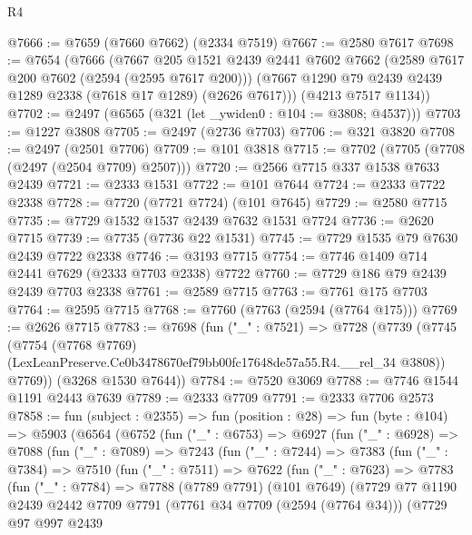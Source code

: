 \begin{lexlean}{R4}
\begin{coremodule}
@7666 := @7659 (@7660 @7662) (@2334 @7519)
@7667 := @2580 @7617
@7698 := @7654
    (@7666
      (@7667
        @205
        @1521
        @2439
        @2441
        @7602
        @7662
        (@2589 @7617 @200 @7602 (@2594 (@2595 @7617 @200)))
        (@7667 @1290 @79 @2439 @2439 @1289 @2338 (@7618 @17 @1289) (@2626 @7617)))
      (@4213 @7517 @1134))
@7702 := @2497 (@6565 (@321 (let _ywiden0 : @104 := @3808; @4537)))
@7703 := @1227 @3808
@7705 := @2497 (@2736 @7703)
@7706 := @321 @3820
@7708 := @2497 (@2501 @7706)
@7709 := @101 @3818
@7715 := @7702 (@7705 (@7708 (@2497 (@2504 @7709) @2507)))
@7720 := @2566 @7715 @337 @1538 @7633 @2439
@7721 := @2333 @1531
@7722 := @101 @7644
@7724 := @2333 @7722 @2338
@7728 := @7720 (@7721 @7724) (@101 @7645)
@7729 := @2580 @7715
@7735 := @7729 @1532 @1537 @2439 @7632 @1531 @7724
@7736 := @2620 @7715
@7739 := @7735 (@7736 @22 @1531)
@7745 := @7729 @1535 @79 @7630 @2439 @7722 @2338
@7746 := @3193 @7715
@7754 := @7746 @1409 @714 @2441 @7629 (@2333 @7703 @2338) @7722
@7760 := @7729 @186 @79 @2439 @2439 @7703 @2338
@7761 := @2589 @7715
@7763 := @7761 @175 @7703
@7764 := @2595 @7715
@7768 := @7760 (@7763 (@2594 (@7764 @175)))
@7769 := @2626 @7715
@7783 := @7698
    (fun ("_" : @7521) =>
    @7728
      (@7739
        (@7745
          (@7754
            (@7768 @7769)
            (LexLeanPreserve.Ce0b3478670ef79bb00fc17648de57a55.R4.__rel_34 @3808))
          @7769))
      (@3268 @1530 @7644))
@7784 := @7520 @3069
@7788 := @7746 @1544 @1191 @2443 @7639
@7789 := @2333 @7709
@7791 := @2333 @7706 @2573
@7858 := fun (subject : @2355) =>
  fun (position : @28) =>
  fun (byte : @104) =>
  @5903
    (@6564
      (@6752
        (fun ("_" : @6753) =>
        @6927
          (fun ("_" : @6928) =>
          @7088
            (fun ("_" : @7089) =>
            @7243
              (fun ("_" : @7244) =>
              @7383
                (fun ("_" : @7384) =>
                @7510
                  (fun ("_" : @7511) =>
                  @7622
                    (fun ("_" : @7623) =>
                    @7783
                      (fun ("_" : @7784) =>
                      @7788
                        (@7789 @7791)
                        (@101 @7649)
                        (@7729
                          @77
                          @1190
                          @2439
                          @2442
                          @7709
                          @7791
                          (@7761 @34 @7709 (@2594 (@7764 @34)))
                          (@7729
                            @97
                            @997
                            @2439

\end{coremodule}
\end{lexlean}
